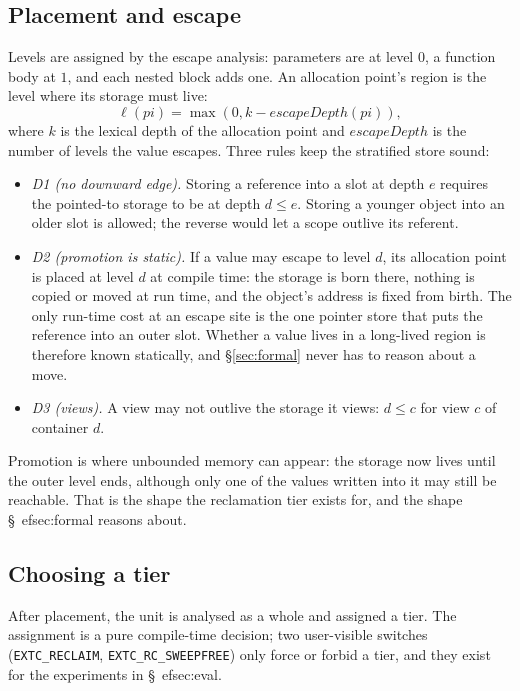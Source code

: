 \subsection{Placement and escape}
\label{sec:placement}

Levels are assigned by the escape analysis: parameters are at level $0$, a function body at
$1$, and each nested block adds one.
An allocation point's region is the level where its storage must live:
\begin{equation}
\ell(pi) = \max(0, k - \mathit{escapeDepth}(pi)),
\label{eq:placement}
\end{equation}
where $k$ is the lexical depth of the allocation point and $escapeDepth$ is the number of
levels the value escapes.
Three rules keep the stratified store sound:

\begin{itemize}
\item \emph{D1 (no downward edge).} Storing a reference into a slot at depth $e$ requires the
  pointed-to storage to be at depth $d \le e$. Storing a younger object into an older slot is
  allowed; the reverse would let a scope outlive its referent.
\item \emph{D2 (promotion is static).} If a value may escape to level $d$, its allocation point
  is placed at level $d$ at compile time: the storage is born there, nothing is copied or moved at
  run time, and the object's address is fixed from birth. The only run-time cost at an escape site
  is the one pointer store that puts the reference into an outer slot.
  Whether a value lives in a long-lived region is therefore known statically, and
  \S\ref{sec:formal} never has to reason about a move.
\item \emph{D3 (views).} A view may not outlive the storage it views: $d \le c$ for view
  $c$ of container $d$.
\end{itemize}

Promotion is where unbounded memory can appear: the storage now lives until the outer level ends,
although only one of the values written into it may still be reachable. That is the shape the
reclamation tier exists for, and the shape \S\
ef{sec:formal} reasons about.

\subsection{Choosing a tier}
\label{sec:tiers}

After placement, the unit is analysed as a whole and assigned a tier.
The assignment is a pure compile-time decision; two user-visible switches
(\texttt{EXTC\_RECLAIM}, \texttt{EXTC\_RC\_SWEEPFREE}) only force or forbid a tier, and they exist
for the experiments in \S\
ef{sec:eval}.

